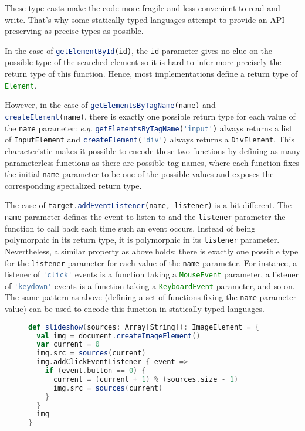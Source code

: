 \documentclass{llncs}
\newcommand{\jscode}[1]{\lstinline[language=JavaScript]|#1|}
\begin{document}
These type casts make the code more fragile and less convenient to read and write. That's why some statically typed languages attempt to provide an API preserving as precise types as possible.

In the case of \jscode{getElementById(id)}, the \jscode{id} parameter gives no clue on the possible type of the searched element so it is hard to infer more precisely the return type of this function. Hence, most implementations define a return type of \jscode{Element}.

However, in the case of \jscode{getElementsByTagName(name)} and \jscode{createElement(name)}, there is exactly one possible return type for each value of the \jscode{name} parameter: \emph{e.g.} \jscode{getElementsByTagName('input')} always returns a list of \jscode{InputElement} and \jscode{createElement('div')} always returns a \jscode{DivElement}. This characteristic makes it possible to encode these two functions by defining as many parameterless functions as there are possible tag names, where each function fixes the initial \jscode{name} parameter to be one of the possible values and exposes the corresponding specialized return type.

The case of \jscode{target.addEventListener(name, listener)} is a bit different. The \jscode{name} parameter defines the event to listen to and the \jscode{listener} parameter the function to call back each time such an event occurs. Instead of being polymorphic in its return type, it is polymorphic in its \jscode{listener} parameter. Nevertheless, a similar property as above holds: there is exactly one possible type for the \jscode{listener} parameter for each value of the \jscode{name} parameter. For instance, a listener of \jscode{'click'} events is a function taking a \jscode{MouseEvent} parameter, a listener of \jscode{'keydown'} events is a function taking a \jscode{KeyboardEvent} parameter, and so on. The same pattern as above (defining a set of functions fixing the \jscode{name} parameter value) can be used to encode this function in statically typed languages.

\begin{figure}
\begin{lstlisting}[label=lst-problem-comb,language=Scala,caption={Scala implementation of \texttt{slideshow} using specialized functions}]
def slideshow(sources: Array[String]): ImageElement = {
  val img = document.createImageElement()
  var current = 0
  img.src = sources(current)
  img.addClickEventListener { event =>
    if (event.button == 0) {
      current = (current + 1) % (sources.size - 1)
      img.src = sources(current)
    }
  }
  img
}
\end{lstlisting}
\end{figure}
\end{document}
